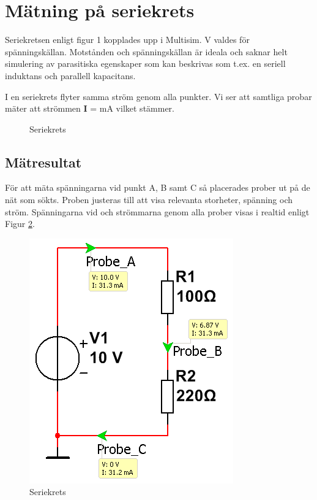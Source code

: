 \documentclass[11pt,a4paper]{article}
\begin{document}
\section{Mätning på seriekrets}\label{}
Seriekretsen enligt figur 1 kopplades upp i Multisim. \unit[10]{\si{\volt}}
valdes för spänningskällan.
Motstånden och spänningskällan är ideala och saknar helt simulering av parasitiska
egenskaper som kan beskrivas som t.ex. en seriell induktans och parallell kapacitans.
\cite{ednarticle}

\par I en seriekrets flyter samma ström genom alla punkter. Vi ser att samtliga probar
mäter att strömmen \textbf{I} = \unit[31,3]{\si{\mA}} vilket stämmer.

\begin{figure}[htbp]
    \centering
    \caption{Seriekrets}
    \label{fig:1-mm-schem}
\end{figure}


\subsection{Mätresultat}\label{}
För att mäta spänningarna vid punkt A, B samt C så placerades prober ut på de
nät som sökts. Proben justeras till att visa relevanta storheter, spänning och
ström.
Spänningarna vid och strömmarna genom alla prober visas i realtid enligt
Figur \ref{fig:sim2}.

\begin{figure}[htbp]
    \centering
    \includegraphics[scale=0.5]{ee466multisim/1.png}
    \caption{Seriekrets}
    \label{fig:sim2}
\end{figure}
\end{document}
